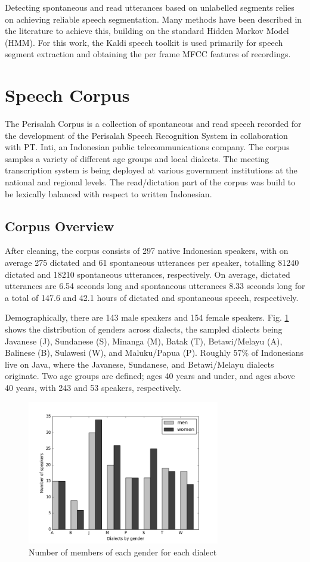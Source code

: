 \documentclass[conference]{IEEEtran}
\begin{document}
Detecting spontaneous and read utterances based on unlabelled segments relies on achieving reliable speech segmentation.
Many methods have been described in the literature to achieve this, building on the standard Hidden Markov Model (HMM).
For this work, the Kaldi speech toolkit \cite{povey} is used primarily for speech segment extraction and obtaining the per frame MFCC features of recordings.

\section{Speech Corpus}

The Perisalah Corpus is a collection of spontaneous and read speech recorded for the development of the Perisalah Speech Recognition System in collaboration with PT. Inti, an Indonesian public telecommunications company.
The corpus samples a variety of different age groups and local dialects.
The meeting transcription system is being deployed at various government institutions at the national and regional levels.
The read/dictation part of the corpus was build to be lexically balanced with respect to written Indonesian.

\subsection{Corpus Overview}

After cleaning, the corpus consists of 297 native Indonesian speakers, with on average 275 dictated and 61 spontaneous utterances per speaker, totalling 81240 dictated and 18210 spontaneous utterances, respectively.
On average, dictated utterances are 6.54 seconds long and spontaneous utterances 8.33 seconds long for a total of 147.6 and 42.1 hours of dictated and spontaneous speech, respectively.

Demographically, there are 143 male speakers and 154 female speakers.
Fig. \ref{demographics1} shows the distribution of genders across dialects, the sampled dialects being Javanese (J), Sundanese (S), Minanga (M), Batak (T), Betawi/Melayu (A), Balinese (B), Sulawesi (W), and Maluku/Papua (P).
Roughly 57\% of Indonesians live on Java, where the Javanese, Sundanese, and Betawi/Melayu dialects originate.
Two age groups are defined; ages 40 years and under, and ages above 40 years, with 243 and 53 speakers, respectively.

\begin{figure}[!htb]
\centering
\includegraphics[width=3.3in]{demograph}
\caption{Number of members of each gender for each dialect}
\label{demographics1}
\end{figure}
\end{document}
